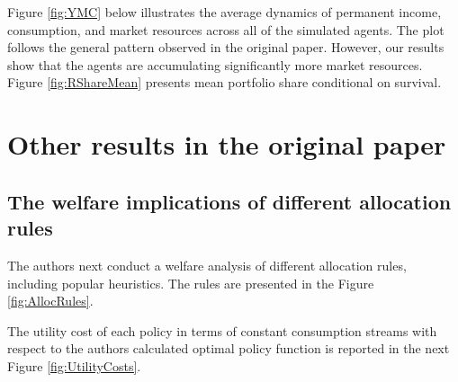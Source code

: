 \documentclass[./CGMPortfolio.tex]{subfiles}
\begin{document}
Figure \ref{fig:YMC} below illustrates the average dynamics of permanent income, consumption, and market resources across all of the simulated agents. The plot follows the general pattern observed in the original paper. However, our results show that the agents are accumulating significantly more market resources. Figure \ref{fig:RShareMean} presents mean portfolio share conditional on survival.

\providecommand{\figName}{Variable-Means-Conditional-on-Survival} %
\providecommand{\figFile}{YMC_Means} %
\hypertarget{\figFile}{}
\hypertarget{\figName}{}

\providecommand{\figName}{RShare-Means-Conditional-on-Survival} %
\providecommand{\figFile}{RShare_Means} %
\hypertarget{\figFile}{}
\hypertarget{\figName}{}

\section{Other results in the original paper}

\subsection{The welfare implications of different allocation rules}

The authors next conduct a welfare analysis of different allocation rules, including popular heuristics. The rules are presented in the Figure \ref{fig:AllocRules}.

\providecommand{\figName}{Allocation-Rules} %
\providecommand{\figFile}{Alloc_rules} %
\hypertarget{\figFile}{}
\hypertarget{\figName}{}

The utility cost of each policy in terms of constant consumption streams with respect to the authors calculated optimal policy function is reported in the next Figure \ref{fig:UtilityCosts}.

\providecommand{\figName}{Utility-Costs} %
\providecommand{\figFile}{Util_cost} %
\hypertarget{\figFile}{}
\hypertarget{\figName}{}
\end{document}
